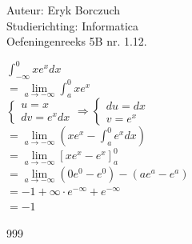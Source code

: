 \documentclass[a4paper]{article}
\begin{document}
  
\noindent \large Auteur: Eryk Borczuch \\
\noindent \large Studierichting: Informatica\\
\noindent \large Oefeningenreeks 5B nr. 1.12.\\

\medskip

\normalsize

$\displaystyle\int_{-\infty}^{0} xe^x dx$\\

$= \lim\limits_{a \to -\infty} \displaystyle\int_{a}^{0} x e^x $\\

$\left\{
   \begin{array}{l}
       u = x\\
       dv = e^x dx
   \end{array}
\right.
\Rightarrow
\left\{
   \begin{array}{l}
       du = dx \\
       v =e^x
   \end{array}
\right.$\\

$= \lim\limits_{a \to -\infty} \left(x e^x - \displaystyle\int_{a}^{0}e^x dx\right) $\\

$= \lim\limits_{a \to -\infty} [xe^x - e^x]_{a}^{0}$\\

$= \lim\limits_{a \to -\infty} (0e^0-e^0)-(ae^a-e^a)$\\

$= -1 +\infty\cdot e^{-\infty} + e^{-\infty} $\\

$= -1 $\\

\begin{thebibliography}{999}
\end{thebibliography}
\end{document}
